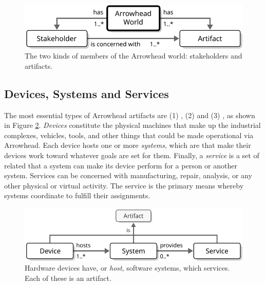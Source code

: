 \vspace*{1mm}

\begin{figure}[ht!]
  \centering
  \includegraphics[scale=0.9]{figures/world}
  \caption{
    The two kinds of members of the Arrowhead world: stakeholders and artifacts.
  }
  \label{fig:world}
\end{figure}

\vspace*{-3mm}

\subsection{Devices, Systems and Services}

The most essential types of Arrowhead artifacts are (1) , (2)  and (3) , as shown in Figure \ref{fig:device-system-service}.
\textit{Devices} constitute the physical machines that make up the industrial complexes, vehicles, tools, and other things that could be made operational via Arrowhead.
Each device hosts one or more \textit{systems}, which are   that make their devices work toward whatever goals are set for them.
Finally, a \textit{service} is a set of related  that a system can make its device perform for a person or another system.
Services can be concerned with manufacturing, repair, analysis, or any other physical or virtual activity.
The service is the primary means whereby systems coordinate to fulfill their assignments.

\vspace*{1mm}

\begin{figure}[ht!]
  \centering
  \includegraphics[scale=0.9]{figures/device-system-service}
  \caption{
    Hardware devices have, or \textit{host}, software systems, which  services.
    Each of these is an artifact.
  }
  \label{fig:device-system-service}
\end{figure}

